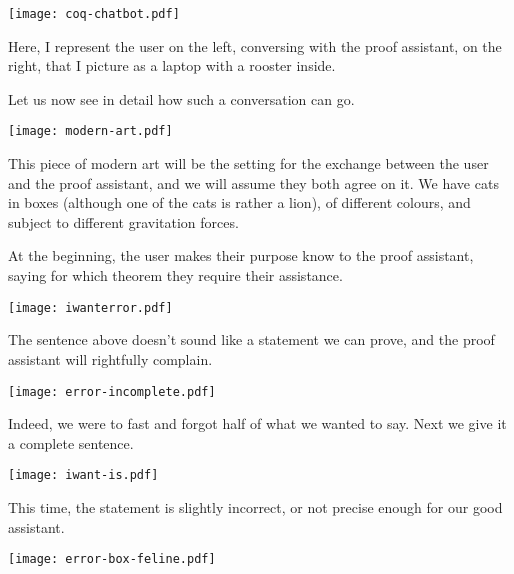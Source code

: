 %
\begin{center}
  \texttt{[image: coq-chatbot.pdf]}
\end{center}

Here, I represent the user on the left, conversing with the proof assistant, on
the right, that I picture as a laptop with a rooster inside.

Let us now see in detail how such a conversation can go.

\begin{center}
  \texttt{[image: modern-art.pdf]}
\end{center}

This piece of modern art will be the setting for the exchange between the user
and the proof assistant, and we will assume they both agree on it.
We have cats in boxes (although one of the cats is rather a lion), of different
colours, and subject to different gravitation forces.

At the beginning, the user makes their purpose know to the proof assistant,
saying for which theorem they require their assistance.

\begin{center}
  \texttt{[image: iwanterror.pdf]}
\end{center}

The sentence above doesn't sound like a statement we can prove, and the proof
assistant will rightfully complain.

\begin{center}
  \texttt{[image: error-incomplete.pdf]}
\end{center}

Indeed, we were to fast and forgot half of what we wanted to say. Next we give
it a complete sentence.

\begin{center}
  \texttt{[image: iwant-is.pdf]}
\end{center}

This time, the statement is slightly incorrect, or not precise enough for our
good assistant.

\begin{center}
  \texttt{[image: error-box-feline.pdf]}
\end{center}


